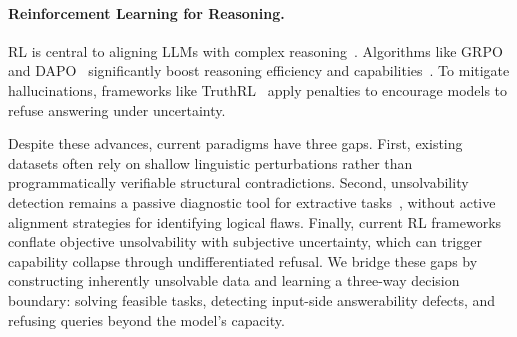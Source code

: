 \paragraph{Reinforcement Learning for Reasoning.} 
RL is central to aligning LLMs with complex reasoning~\citep{ouyang2022traininglanguagemodelsfollow, schulman2017proximalpolicyoptimizationalgorithms, rafailov2024directpreferenceoptimizationlanguage}. Algorithms like GRPO~\citep{shao2024deepseekmath} and DAPO~\citep{yu2025dapoopensourcellmreinforcement} significantly boost reasoning efficiency and capabilities~\citep{sheng2025hybridflow, tu2025learning, team2025kimi, guo2025deepseek, wang2025aspoasymmetricimportancesampling, chen2025aware}. To mitigate hallucinations, frameworks like TruthRL~\citep{wei2025truthrl} apply penalties to encourage models to refuse answering under uncertainty.

Despite these advances, current paradigms have three gaps. First, existing datasets often rely on shallow linguistic perturbations rather than programmatically verifiable structural contradictions. Second, unsolvability detection remains a passive diagnostic tool for extractive tasks~\citep{lavi2025detecting}, without active alignment strategies for identifying logical flaws. Finally, current RL frameworks conflate objective unsolvability with subjective uncertainty, which can trigger capability collapse through undifferentiated refusal. We bridge these gaps by constructing inherently unsolvable data and learning a three-way decision boundary: solving feasible tasks, detecting input-side answerability defects, and refusing queries beyond the model's capacity.
